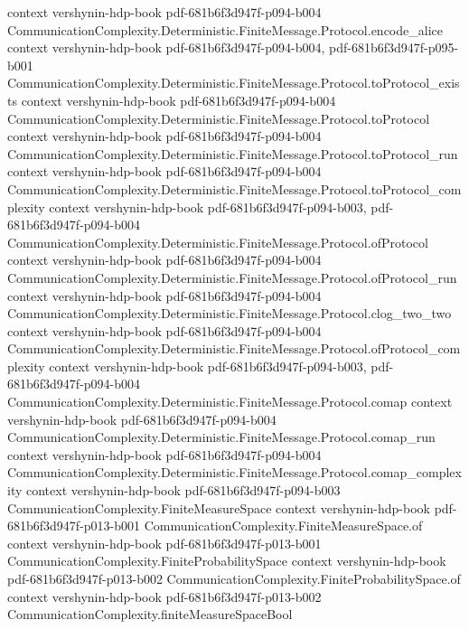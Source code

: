 \begin{theorem}
  {context}
  {vershynin-hdp-book}
  {pdf-681b6f3d947f-p094-b004}
\proofstep
  {CommunicationComplexity.Deterministic.FiniteMessage.Protocol.encode_alice}
  {context}
  {vershynin-hdp-book}
  {pdf-681b6f3d947f-p094-b004,
    pdf-681b6f3d947f-p095-b001}
\proofstep
  {CommunicationComplexity.Deterministic.FiniteMessage.Protocol.toProtocol_exists}
  {context}
  {vershynin-hdp-book}
  {pdf-681b6f3d947f-p094-b004}
\proofstep
  {CommunicationComplexity.Deterministic.FiniteMessage.Protocol.toProtocol}
  {context}
  {vershynin-hdp-book}
  {pdf-681b6f3d947f-p094-b004}
\proofstep
  {CommunicationComplexity.Deterministic.FiniteMessage.Protocol.toProtocol_run}
  {context}
  {vershynin-hdp-book}
  {pdf-681b6f3d947f-p094-b004}
\proofstep
  {CommunicationComplexity.Deterministic.FiniteMessage.Protocol.toProtocol_complexity}
  {context}
  {vershynin-hdp-book}
  {pdf-681b6f3d947f-p094-b003,
    pdf-681b6f3d947f-p094-b004}
\proofstep
  {CommunicationComplexity.Deterministic.FiniteMessage.Protocol.ofProtocol}
  {context}
  {vershynin-hdp-book}
  {pdf-681b6f3d947f-p094-b004}
\proofstep
  {CommunicationComplexity.Deterministic.FiniteMessage.Protocol.ofProtocol_run}
  {context}
  {vershynin-hdp-book}
  {pdf-681b6f3d947f-p094-b004}
\proofstep
  {CommunicationComplexity.Deterministic.FiniteMessage.Protocol.clog_two_two}
  {context}
  {vershynin-hdp-book}
  {pdf-681b6f3d947f-p094-b004}
\proofstep
  {CommunicationComplexity.Deterministic.FiniteMessage.Protocol.ofProtocol_complexity}
  {context}
  {vershynin-hdp-book}
  {pdf-681b6f3d947f-p094-b003,
    pdf-681b6f3d947f-p094-b004}
\proofstep
  {CommunicationComplexity.Deterministic.FiniteMessage.Protocol.comap}
  {context}
  {vershynin-hdp-book}
  {pdf-681b6f3d947f-p094-b004}
\proofstep
  {CommunicationComplexity.Deterministic.FiniteMessage.Protocol.comap_run}
  {context}
  {vershynin-hdp-book}
  {pdf-681b6f3d947f-p094-b004}
\proofstep
  {CommunicationComplexity.Deterministic.FiniteMessage.Protocol.comap_complexity}
  {context}
  {vershynin-hdp-book}
  {pdf-681b6f3d947f-p094-b003}
\proofstep
  {CommunicationComplexity.FiniteMeasureSpace}
  {context}
  {vershynin-hdp-book}
  {pdf-681b6f3d947f-p013-b001}
\proofstep
  {CommunicationComplexity.FiniteMeasureSpace.of}
  {context}
  {vershynin-hdp-book}
  {pdf-681b6f3d947f-p013-b001}
\proofstep
  {CommunicationComplexity.FiniteProbabilitySpace}
  {context}
  {vershynin-hdp-book}
  {pdf-681b6f3d947f-p013-b002}
\proofstep
  {CommunicationComplexity.FiniteProbabilitySpace.of}
  {context}
  {vershynin-hdp-book}
  {pdf-681b6f3d947f-p013-b002}
\proofstep
  {CommunicationComplexity.finiteMeasureSpaceBool}

\end{theorem}
